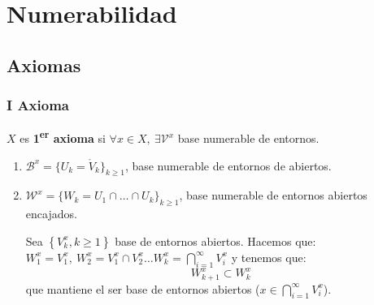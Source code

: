 \chapter{Numerabilidad}%
\label{cha:numerabilidad}

\section{Axiomas}%
\label{sec:axiomas}
\subsection{I Axioma}%
\label{sub:i_axioma}
\begin{defi}[I Ax.]
$X$ es \textbf{1\textsuperscript{er} axioma} si $\forall x \in X,\ \exists \mathcal{V}^x$ base numerable de entornos.  
\end{defi}

\begin{obs}
\begin{enumerate}
    \item $\mathcal{B}^x = \{U_k = \mathring{V}_k \}_{k \ge 1}$, base numerable de entornos de abiertos.
    \item $\mathcal{W}^x = \{W_k = U_1 \cap \ldots \cap U_k\}_{k \ge 1}$, base numerable de entornos abiertos encajados.
    \begin{demo}
        Sea $\left\{ V_k^x, k \ge 1 \right\}$ base de entornos abiertos. Hacemos que: $W_1^x = V_1^x,\ W_2^x = V_1^x \cap V_2^x \ldots W_k^x = \bigcap_{i = 1}^{\infty} V_i^x$ y tenemos que:
        \[
        W_{k+1}^x \subset W_{k}^x
        \]
        que mantiene el ser base de entornos abiertos ($x \in \bigcap_{i = 1}^{\infty} V_i^x$).
    \end{demo}
\end{enumerate}
\end{obs}


